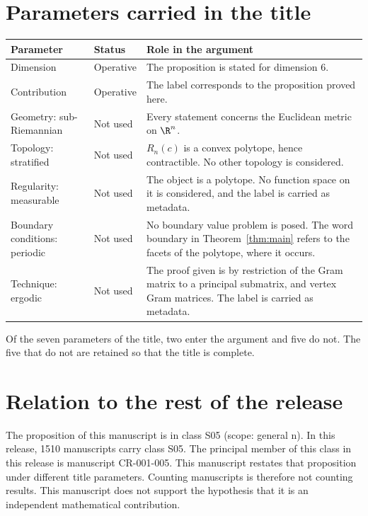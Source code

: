 \documentclass[11pt]{article}
\begin{document}
\section{Parameters carried in the title}\label{sec:params}
\begin{center}
\small
\begin{tabular}{p{}p{}p{}}
\toprule
Parameter & Status & Role in the argument \\
\midrule
Dimension & Operative & The proposition is stated for dimension $6$. \\
Contribution & Operative & The label corresponds to the proposition proved here. \\
Geometry: sub-Riemannian & Not used & Every statement concerns the Euclidean metric on $\R^n$. \\
Topology: stratified & Not used & $R_n(c)$ is a convex polytope, hence contractible. No other topology is considered. \\
Regularity: measurable & Not used & The object is a polytope. No function space on it is considered, and the label is carried as metadata. \\
Boundary conditions: periodic & Not used & No boundary value problem is posed. The word boundary in Theorem~\ref{thm:main} refers to the facets of the polytope, where it occurs. \\
Technique: ergodic & Not used & The proof given is by restriction of the Gram matrix to a principal submatrix, and vertex Gram matrices. The label is carried as metadata. \\
\bottomrule
\end{tabular}
\end{center}
Of the seven parameters of the title, two enter the argument and five do not. The five that do not are retained so that the title is complete.

\section{Relation to the rest of the release}
The proposition of this manuscript is in class S05 (scope: general n).
In this release, 1510 manuscripts carry class S05. The principal member of this class in this release is manuscript CR-001-005. This manuscript restates that proposition under different title parameters.
Counting manuscripts is therefore not counting results. This manuscript does not support the hypothesis that it is an independent mathematical contribution.
\end{document}
